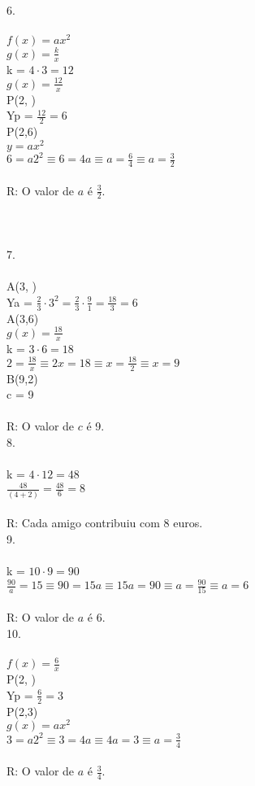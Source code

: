 \documentclass[12pt]{article}
\begin{document}
6.\\\\
$f(x)=ax^2$\\
$g(x)=\frac{k}{x}$\\
k = $4\cdot3=12$\\
$g(x)=\frac{12}{x}$\\
P(2, )\\
Yp = $\frac{12}{2}=6$\\
P(2,6)\\
$y=ax^2$\\
$6=a2^2\equiv6=4a\equiv a=\frac{6}{4}\equiv a=\frac{3}{2}$\\\\
R: O valor de $a$ é $\frac{3}{2}$.\\\\\\\\

7.\\\\
A(3, )\\
Ya = $\frac{2}{3}\cdot3^2=\frac{2}{3}\cdot\frac{9}{1}=\frac{18}{3}=6$\\
A(3,6)\\
$g(x)=\frac{18}{x}$\\
k = $3\cdot6=18$\\
$2=\frac{18}{x}\equiv2x=18\equiv x=\frac{18}{2}\equiv x=9$\\
B(9,2)\\
c = 9\\\\
R: O valor de $c$ é 9.\\

8.\\\\
k = $4\cdot12=48$\\
$\frac{48}{(4+2)}=\frac{48}{6}=8$\\\\
R: Cada amigo contribuiu com 8 euros.\\

9.\\\\
k = $10\cdot9=90$\\
$\frac{90}{a}=15\equiv90=15a\equiv15a=90\equiv a=\frac{90}{15}\equiv a=6$\\\\
R: O valor de $a$ é 6.\\

10.\\\\
$f(x)=\frac{6}{x}$\\
P(2, )\\
Yp = $\frac{6}{2}=3$\\
P(2,3)\\
$g(x)=ax^2$\\
$3=a2^2\equiv3=4a\equiv4a=3\equiv a=\frac{3}{4}$\\\\
R: O valor de $a$ é $\frac{3}{4}$.\\
\end{document}
